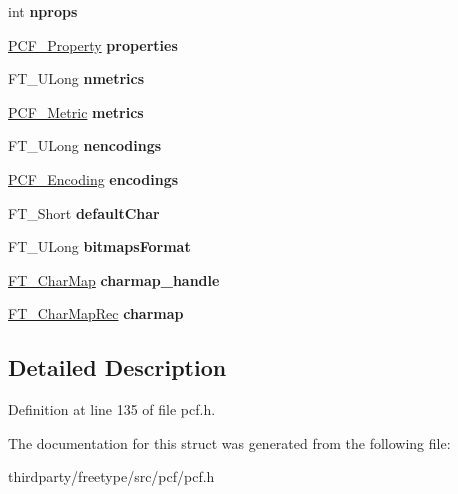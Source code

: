 \begin{DoxyCompactItemize}
int {\bfseries nprops}
\item 
\mbox{\label{struct_p_c_f___face_rec___af9d68a587f4d07fe5c8782a1edf47faa}} 
\hyperlink{struct_p_c_f___property_rec__}{P\+C\+F\+\_\+\+Property} {\bfseries properties}
\item 
\mbox{\label{struct_p_c_f___face_rec___a6ddfde021b6866cf9c12eb881bc6b29c}} 
F\+T\+\_\+\+U\+Long {\bfseries nmetrics}
\item 
\mbox{\label{struct_p_c_f___face_rec___abf1b0ff1a51b11de47000f7f34b5f8bf}} 
\hyperlink{struct_p_c_f___metric_rec__}{P\+C\+F\+\_\+\+Metric} {\bfseries metrics}
\item 
\mbox{\label{struct_p_c_f___face_rec___a5f215281a96aec84ea77f976c0fca92e}} 
F\+T\+\_\+\+U\+Long {\bfseries nencodings}
\item 
\mbox{\label{struct_p_c_f___face_rec___ae22d68a972fbdda6ce79569d373d3d2d}} 
\hyperlink{struct_p_c_f___encoding_rec__}{P\+C\+F\+\_\+\+Encoding} {\bfseries encodings}
\item 
\mbox{\label{struct_p_c_f___face_rec___a3251bb495b2c1dec4eddcf8e29413555}} 
F\+T\+\_\+\+Short {\bfseries default\+Char}
\item 
\mbox{\label{struct_p_c_f___face_rec___af1331f54c25d919b0a5949f829f5407e}} 
F\+T\+\_\+\+U\+Long {\bfseries bitmaps\+Format}
\item 
\mbox{\label{struct_p_c_f___face_rec___a06d9b5fe1a219df68d66ee68232db271}} 
\hyperlink{struct_f_t___char_map_rec__}{F\+T\+\_\+\+Char\+Map} {\bfseries charmap\+\_\+handle}
\item 
\mbox{\label{struct_p_c_f___face_rec___a9cee8b94fd0fff40b65301c29ab46e28}} 
\hyperlink{struct_f_t___char_map_rec__}{F\+T\+\_\+\+Char\+Map\+Rec} {\bfseries charmap}
\end{DoxyCompactItemize}


\subsection{Detailed Description}


Definition at line 135 of file pcf.\+h.



The documentation for this struct was generated from the following file\+:\begin{DoxyCompactItemize}
\item 
thirdparty/freetype/src/pcf/pcf.\+h\end{DoxyCompactItemize}
